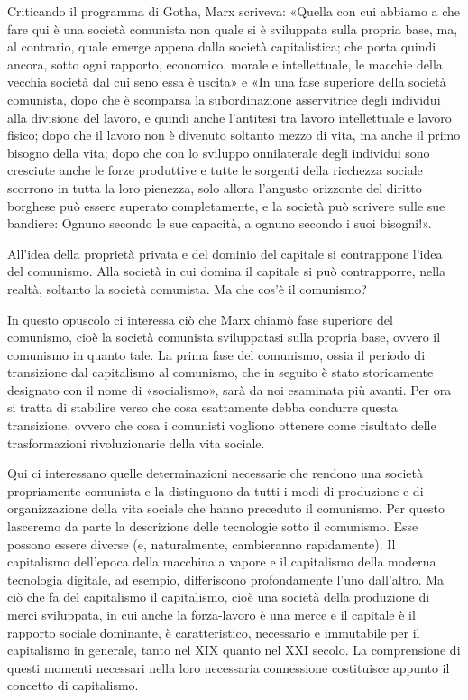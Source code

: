 \documentclass[12pt,a4paper,openany]{book}
\begin{document}
Criticando il programma di Gotha, Marx scriveva: «Quella con cui abbiamo a che fare qui è una società comunista non quale si è sviluppata sulla propria base, ma, al contrario, quale emerge appena dalla società capitalistica; che porta quindi ancora, sotto ogni rapporto, economico, morale e intellettuale, le macchie della vecchia società dal cui seno essa è uscita» e «In una fase superiore della società comunista, dopo che è scomparsa la subordinazione asservitrice degli individui alla divisione del lavoro, e quindi anche l'antitesi tra lavoro intellettuale e lavoro fisico; dopo che il lavoro non è divenuto soltanto mezzo di vita, ma anche il primo bisogno della vita; dopo che con lo sviluppo onnilaterale degli individui sono cresciute anche le forze produttive e tutte le sorgenti della ricchezza sociale scorrono in tutta la loro pienezza, solo allora l'angusto orizzonte del diritto borghese può essere superato completamente, e la società può scrivere sulle sue bandiere: Ognuno secondo le sue capacità, a ognuno secondo i suoi bisogni!».

All'idea della proprietà privata e del dominio del capitale si contrappone l'idea del comunismo. Alla società in cui domina il capitale si può contrapporre, nella realtà, soltanto la società comunista. Ma che cos'è il comunismo?

In questo opuscolo ci interessa ciò che Marx chiamò fase superiore del comunismo, cioè la società comunista sviluppatasi sulla propria base, ovvero il comunismo in quanto tale. La prima fase del comunismo, ossia il periodo di transizione dal capitalismo al comunismo, che in seguito è stato storicamente designato con il nome di «socialismo», sarà da noi esaminata più avanti. Per ora si tratta di stabilire verso che cosa esattamente debba condurre questa transizione, ovvero che cosa i comunisti vogliono ottenere come risultato delle trasformazioni rivoluzionarie della vita sociale.

Qui ci interessano quelle determinazioni necessarie che rendono una società propriamente comunista e la distinguono da tutti i modi di produzione e di organizzazione della vita sociale che hanno preceduto il comunismo. Per questo lasceremo da parte la descrizione delle tecnologie sotto il comunismo. Esse possono essere diverse (e, naturalmente, cambieranno rapidamente). Il capitalismo dell'epoca della macchina a vapore e il capitalismo della moderna tecnologia digitale, ad esempio, differiscono profondamente l'uno dall'altro. Ma ciò che fa del capitalismo il capitalismo, cioè una società della produzione di merci sviluppata, in cui anche la forza-lavoro è una merce e il capitale è il rapporto sociale dominante, è caratteristico, necessario e immutabile per il capitalismo in generale, tanto nel XIX quanto nel XXI secolo. La comprensione di questi momenti necessari nella loro necessaria connessione costituisce appunto il concetto di capitalismo.
\end{document}

